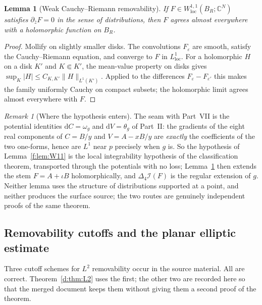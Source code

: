 \documentclass[11pt,a4paper]{article}
\numberwithin{equation}{section}
\newtheorem{lemma}[theorem]{Lemma}
\theoremstyle{definition}
\theoremstyle{remark}
\newtheorem{remark}[theorem]{Remark}
\theoremstyle{plain}
\newcommand{\CC}{\mathbb C}
\newcommand{\lap}{\Delta_4}
\newcommand{\I}{\mathcal I}
\newcommand{\om}{\omega}
\newcommand{\thet}{\theta}
\newcommand{\pot}{C}          %
\newcommand{\potV}{V}         %
\newcommand{\abs}[1]{\lvert #1\rvert}
\newcommand{\norm}[1]{\lVert #1\rVert}
\newcommand{\dd}{\mathrm d}
\begin{document}
\begin{lemma}[Weak Cauchy--Riemann removability]
\label{f:lem:weakCR}
If $F\in W^{1,1}_{\mathrm{loc}}(B_R;\CC^N)$ satisfies
$\partial_{\bar z}F=0$ in the sense of distributions, then $F$ agrees
almost everywhere with a holomorphic function on $B_R$.
\end{lemma}
\begin{proof}
Mollify on slightly smaller disks. The convolutions $F_\varepsilon$ are
smooth, satisfy the Cauchy--Riemann equation, and converge to $F$ in
$L^1_{\mathrm{loc}}$. For a holomorphic $H$ on a disk $K'$ and
$K\Subset K'$, the mean-value property on disks gives
$\sup_K\abs H\le C_{K,K'}\norm H_{L^1(K')}$. Applied to the differences
$F_\varepsilon-F_{\varepsilon'}$ this makes the family uniformly Cauchy on
compact subsets; the holomorphic limit agrees almost everywhere with $F$.
\end{proof}

\begin{remark}[Where the hypothesis enters]
The seam with Part~VII is the potential identities $\dd\pot=\om_g$ and
$\dd\potV=\thet_g$ of Part~II: the gradients of the eight real components
of $\pot=B/y$ and $\potV=A-xB/y$ are \emph{exactly} the coefficients of the
two one-forms, hence are $L^1$ near $p$ precisely when $g$ is. So the
hypothesis of Lemma~\ref{f:lem:W11} is the local integrability hypothesis
of the classification theorem, transported through the potentials with no
loss; Lemma~\ref{f:lem:weakCR} then extends the stem $F=A+\iota B$
holomorphically, and $\lap\I(F)$ is the regular extension of $g$. Neither
lemma uses the structure of distributions supported at a point, and neither
produces the surface source; the two routes are genuinely independent
proofs of the same theorem.
\end{remark}

\subsection{Removability cutoffs and the planar elliptic estimate}
\label{f:sub:cutoffs}

Three cutoff schemes for $L^2$ removability occur in the source material.
All are correct. Theorem~\ref{d:thm:L2} uses the first; the other two are
recorded here so that the merged document keeps them without giving them a
second proof of the theorem.
\end{document}
